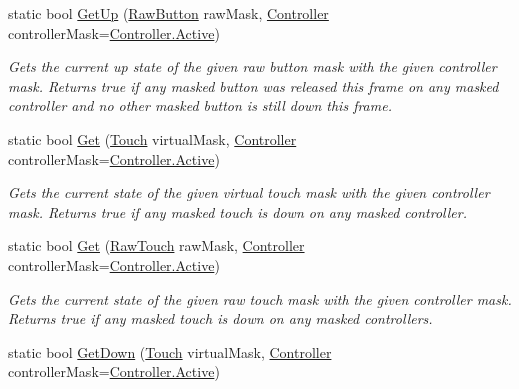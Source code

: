 \begin{DoxyCompactItemize}
static bool \mbox{\hyperlink{class_o_v_r_input_a4dd206208ab9835257a2495e92f41f71}{Get\+Up}} (\mbox{\hyperlink{class_o_v_r_input_a9d6423af820e22b93f0b33a4fc4bf77a}{Raw\+Button}} raw\+Mask, \mbox{\hyperlink{class_o_v_r_input_a5c86f9052a9cbb0b73779ff5704d60a8}{Controller}} controller\+Mask=\mbox{\hyperlink{class_o_v_r_input_a5c86f9052a9cbb0b73779ff5704d60a8a4d3d769b812b6faa6b76e1a8abaece2d}{Controller.\+Active}})
\begin{DoxyCompactList}\small\item\em Gets the current up state of the given raw button mask with the given controller mask. Returns true if any masked button was released this frame on any masked controller and no other masked button is still down this frame. \end{DoxyCompactList}\item 
static bool \mbox{\hyperlink{class_o_v_r_input_a166b60cfe8c0d26773c5bbe03194bbaf}{Get}} (\mbox{\hyperlink{class_o_v_r_input_a4e1f1eb856223383aefc1965dd2db39a}{Touch}} virtual\+Mask, \mbox{\hyperlink{class_o_v_r_input_a5c86f9052a9cbb0b73779ff5704d60a8}{Controller}} controller\+Mask=\mbox{\hyperlink{class_o_v_r_input_a5c86f9052a9cbb0b73779ff5704d60a8a4d3d769b812b6faa6b76e1a8abaece2d}{Controller.\+Active}})
\begin{DoxyCompactList}\small\item\em Gets the current state of the given virtual touch mask with the given controller mask. Returns true if any masked touch is down on any masked controller. \end{DoxyCompactList}\item 
static bool \mbox{\hyperlink{class_o_v_r_input_a406a3baba0bd66abfe0d158a711f53dc}{Get}} (\mbox{\hyperlink{class_o_v_r_input_a6e130faa2035c5b20853c1177d909cc6}{Raw\+Touch}} raw\+Mask, \mbox{\hyperlink{class_o_v_r_input_a5c86f9052a9cbb0b73779ff5704d60a8}{Controller}} controller\+Mask=\mbox{\hyperlink{class_o_v_r_input_a5c86f9052a9cbb0b73779ff5704d60a8a4d3d769b812b6faa6b76e1a8abaece2d}{Controller.\+Active}})
\begin{DoxyCompactList}\small\item\em Gets the current state of the given raw touch mask with the given controller mask. Returns true if any masked touch is down on any masked controllers. \end{DoxyCompactList}\item 
static bool \mbox{\hyperlink{class_o_v_r_input_a2ac7a06a7df7f7e3371d7183d144dea9}{Get\+Down}} (\mbox{\hyperlink{class_o_v_r_input_a4e1f1eb856223383aefc1965dd2db39a}{Touch}} virtual\+Mask, \mbox{\hyperlink{class_o_v_r_input_a5c86f9052a9cbb0b73779ff5704d60a8}{Controller}} controller\+Mask=\mbox{\hyperlink{class_o_v_r_input_a5c86f9052a9cbb0b73779ff5704d60a8a4d3d769b812b6faa6b76e1a8abaece2d}{Controller.\+Active}})

\end{DoxyCompactItemize}
